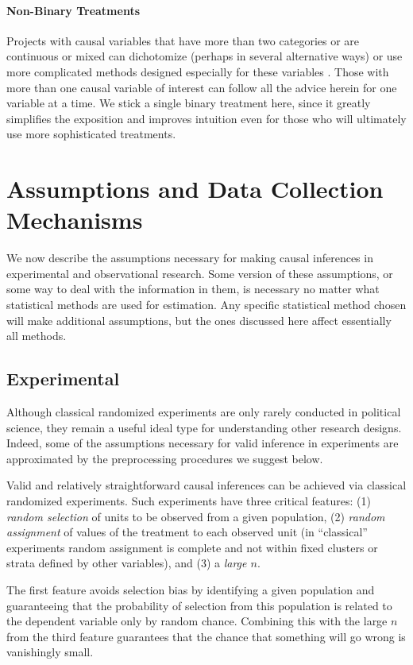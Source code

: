 \documentclass[11pt,titlepage]{article}
\begin{document}
\paragraph{Non-Binary Treatments}

Projects with causal variables that have more than two categories or
are continuous or mixed can dichotomize (perhaps in several
alternative ways) or use more complicated methods designed especially
for these variables \citep{ImaDyk03}.  Those with more than one causal
variable of interest can follow all the advice herein for one variable
at a time.  We stick a single binary treatment here, since it greatly
simplifies the exposition and improves intuition even for those who
will ultimately use more sophisticated treatments.

\section{Assumptions and Data Collection Mechanisms}

We now describe the assumptions necessary for making causal inferences
in experimental and observational research.  Some version of these
assumptions, or some way to deal with the information in them, is
necessary no matter what statistical methods are used for estimation.
Any specific statistical method chosen will make additional
assumptions, but the ones discussed here affect essentially all
methods.

\subsection{Experimental}

Although classical randomized experiments are only rarely conducted in
political science, they remain a useful ideal type for understanding
other research designs.  Indeed, some of the assumptions necessary for
valid inference in experiments are approximated by the preprocessing
procedures we suggest below.

Valid and relatively straightforward causal inferences can be achieved
via classical randomized experiments.  Such experiments have three
critical features: (1) \emph{random selection} of units to be observed
from a given population, (2) \emph{random assignment} of values of the
treatment to each observed unit (in ``classical'' experiments random
assignment is complete and not within fixed clusters or strata defined
by other variables), and (3) a \emph{large $n$}.

The first feature avoids selection bias by identifying a given
population and guaranteeing that the probability of selection from
this population is related to the dependent variable only by random
chance.  Combining this with the large $n$ from the third feature
guarantees that the chance that something will go wrong is vanishingly
small.
\end{document}
